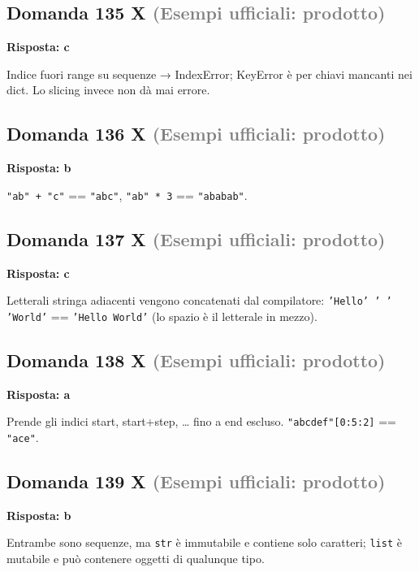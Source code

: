 \documentclass[a4paper,11pt]{article}
\begin{document}
\subsection*{Domanda 135 X \hfill {\small \textcolor{gray}{(Esempi ufficiali: prodotto)}}}
\textbf{Risposta: c}\par
Indice fuori range su sequenze → IndexError; KeyError è per chiavi mancanti nei dict. Lo slicing invece non dà mai errore.



\subsection*{Domanda 136 X \hfill {\small \textcolor{gray}{(Esempi ufficiali: prodotto)}}}
\textbf{Risposta: b}\par
\texttt{"ab" + "c"} == \texttt{"abc"}, \texttt{"ab" * 3} == \texttt{"ababab"}.



\subsection*{Domanda 137 X \hfill {\small \textcolor{gray}{(Esempi ufficiali: prodotto)}}}
\textbf{Risposta: c}\par
Letterali stringa adiacenti vengono concatenati dal compilatore: \texttt{'Hello' ' ' 'World'} == \texttt{'Hello World'} (lo spazio è il letterale in mezzo).



\subsection*{Domanda 138 X \hfill {\small \textcolor{gray}{(Esempi ufficiali: prodotto)}}}
\textbf{Risposta: a}\par
Prende gli indici start, start+step, … fino a end escluso. \texttt{"abcdef"[0:5:2]} == \texttt{"ace"}.



\subsection*{Domanda 139 X \hfill {\small \textcolor{gray}{(Esempi ufficiali: prodotto)}}}
\textbf{Risposta: b}\par
Entrambe sono sequenze, ma \texttt{str} è immutabile e contiene solo caratteri; \texttt{list} è mutabile e può contenere oggetti di qualunque tipo.
\end{document}

